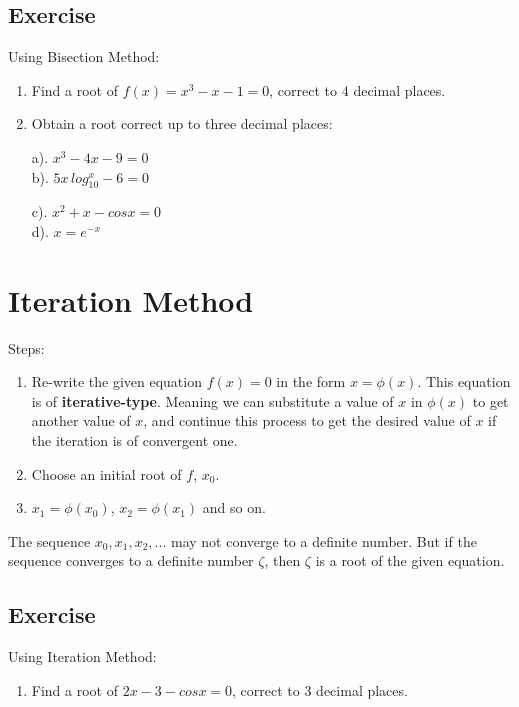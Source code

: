 \documentclass[aima203_lecturenotes_ku.tex]{subfiles}
\begin{document}
\subsection{Exercise}
Using Bisection Method:
\begin{enumerate}
\item Find a root of \(f(x)=x^3-x-1=0\), correct to \(4\) decimal places.
  \item Obtain a root correct up to three decimal places:
  \begin{multicols}{2}
    a). $x^3-4x-9=0$ \\
    b). $5x\, log_{10}^x -6 = 0$

    \columnbreak

    c). $x^2 +x -cosx = 0$ \\
    d). $x=e^{-x}$
  \end{multicols}
\end{enumerate}

\section{Iteration Method}
Steps:
\begin{enumerate}
\item Re-write the given equation \(f(x)=0\) in the form \(x= \phi (x)\).
  This equation is of \textbf{iterative-type}. Meaning we can substitute a value of \(x\) in \(\phi (x)\) to get another value of \(x\), and continue this process to get the desired value of \(x\) if the iteration is of convergent one.
\item Choose an initial root of \(f\), \(x_0\).
\item \(x_1=\phi (x_0)\), \(x_2= \phi(x_1)\) and so on.
\end{enumerate}
The sequence \(x_0, x_1, x_2, ...\) may not converge to a definite number. But if the sequence converges to a definite number \(\zeta\), then \(\zeta\) is a root of the given equation.

\subsection{Exercise}
Using Iteration Method:
\begin{enumerate}
\item Find a root of \(2x-3-cosx=0\), correct to \(3\) decimal places.
\end{enumerate}
\end{document}
